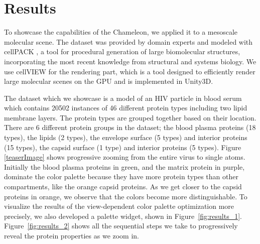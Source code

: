 \documentclass{egpubl}
\begin{document}
		
	\section{Results}
	\label{sec:results}
	
	To showcase the capabilities of the Chameleon, we applied it to a mesoscale molecular scene. 
	The dataset was provided by domain experts and modeled with cellPACK \cite{johnson2015cellpack}, a tool for procedural generation of large biomolecular structures, incorporating the most recent knowledge from structural and systems biology. 
	We use cellVIEW \cite{muzic2015cellview} for the rendering part, which is a tool designed to efficiently render large molecular scenes on the GPU and is implemented in Unity3D. 
	
	The dataset which we showcase is a model of an HIV particle in blood serum which contains 20502 instances of 46 different protein types including two lipid membrane layers.
	The protein types are grouped together based on their location.
	There are 6 different protein groups in the dataset; the blood plasma proteins (18 types), the lipids (2 types), the envelope surface (5 types) and interior proteins (15 types), the capsid surface (1 type) and interior proteins (5 types).
	Figure \ref{teaserImage} shows progressive zooming from the entire virus to single atoms.	
	Initially the blood plasma proteins in green, and the matrix protein in purple, dominate the color palette because they have more protein types than other compartments, like the orange capsid proteins.	
	As we get closer to the capsid proteins in orange, we observe that the colors become more distinguishable.	
	To visualize the results of the view-dependent color palette optimization more precisely, we also developed a palette widget, shown in Figure~\ref{fig:results_1}.
	Figure~\ref{fig:results_2} shows all the sequential steps we take to progressively reveal the protein properties as we zoom in.
	
\end{document}
